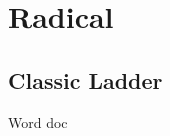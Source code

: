 \newpage
\noindent{}




\newpage
\section{Radical}
\subsection{Classic Ladder}
Word doc
\newpage

~\vfill
